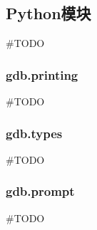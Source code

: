 \subsection{Python模块}

\#TODO

\subsubsection{gdb.printing}
\#TODO

\subsubsection{gdb.types}
\#TODO

\subsubsection{gdb.prompt}
\#TODO
